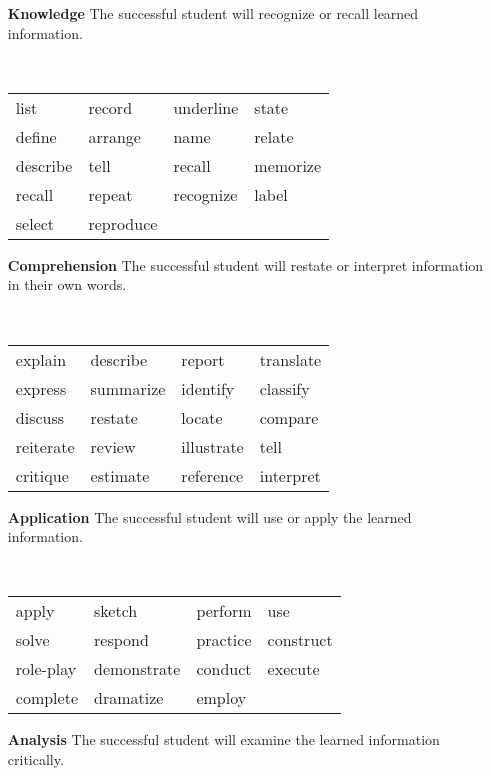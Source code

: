 \documentclass{book}
\begin{document}
\begin{enumerate}
	\item[\bfseries Knowledge] The successful student will recognize or recall learned information.

		\vspace{.1cm}
		~\begin{tabularx}{.7\textwidth}{|XXXX|}
			\hline
			list & record & underline & state\\
			define & arrange & name & relate\\
			describe & tell & recall & memorize\\
			recall & repeat & recognize & label\\
			select & reproduce &&\\\hline
		\end{tabularx}
		\vspace{.1cm}
	\item[\bfseries Comprehension] The successful student will restate or interpret information in their own words.

		\vspace{.1cm}
		~\begin{tabularx}{.7\textwidth}{|XXXX|}
			\hline
explain & describe & report & translate\\
express & summarize & identify & classify\\
discuss & restate & locate & compare\\
reiterate & review & illustrate & tell\\
critique & estimate & reference & interpret\\
			\hline
		\end{tabularx}
		\vspace{.1cm}
	\item[\bfseries Application] The successful student will use or apply the learned information.

		\vspace{.1cm}
		~\begin{tabularx}{.7\textwidth}{|XXXX|}
			\hline
apply & sketch & perform & use\\
solve & respond & practice & construct\\
role-play & demonstrate & conduct & execute\\
			complete & dramatize & employ&\\\hline
		\end{tabularx}
		\vspace{.1cm}
	\item[\bfseries Analysis] The successful student will examine the learned information critically.


\end{enumerate}
\end{document}
